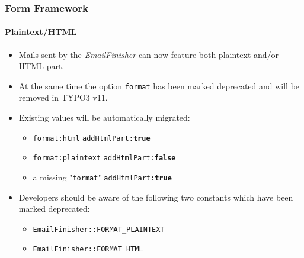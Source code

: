 \begin{frame}[fragile]
	\frametitle{Form Framework}
	\framesubtitle{Plaintext/HTML}

	\begin{itemize}
		\item Mails sent by the \textit{EmailFinisher} can now feature both plaintext and/or HTML part.

		\item At the same time the option \texttt{format} has been marked deprecated and will be removed in TYPO3 v11.

		\item Existing values will be automatically migrated:

			\begin{itemize}\smaller
				\item \texttt{format:html} \tabto{3cm}\textrightarrow\hspace{0.1cm}\texttt{addHtmlPart:\textbf{true}}
				\item \texttt{format:plaintext} \tabto{3cm}\textrightarrow\hspace{0.1cm}\texttt{addHtmlPart:\textbf{false}}
				\item a missing "\texttt{format}" \tabto{3cm}\textrightarrow\hspace{0.1cm}\texttt{addHtmlPart:\textbf{true}}
			\end{itemize}\normalsize

		\item Developers should be aware of the following two constants which have been marked deprecated:

			\begin{itemize}\smaller
				\item \texttt{EmailFinisher::FORMAT\_PLAINTEXT}
				\item \texttt{EmailFinisher::FORMAT\_HTML}
			\end{itemize}\normalsize

	\end{itemize}

\end{frame}


